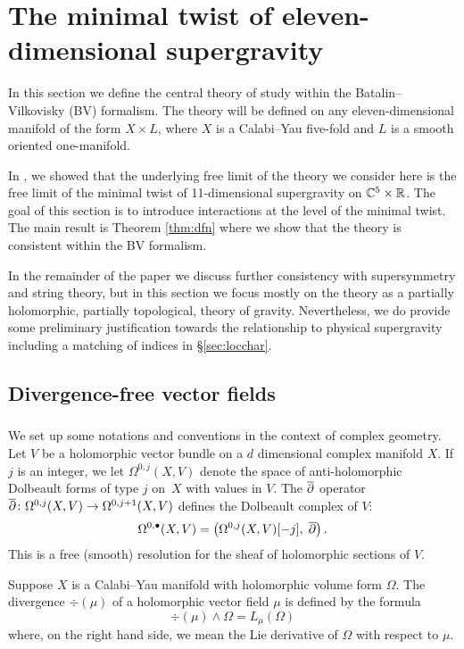 \section{The minimal twist of eleven-dimensional supergravity} 
\label{s:dfn}

In this section we define the central theory of study within the Batalin--Vilkovisky (BV) formalism. 
The theory will be defined on any eleven-dimensional manifold of the form $X \times L$, where $X$ is a Calabi--Yau five-fold and $L$ is a smooth oriented one-manifold.

In \cite{SWspinor}, we showed that the underlying free limit of the theory we consider here is the free limit of the minimal twist of 11-dimensional supergravity on $\mathbb C^5 \times \mathbb R$. 
The goal of this section is to introduce interactions at the level of the minimal twist. 
The main result is Theorem \ref{thm:dfn} where we show that the theory is consistent within the BV formalism. 

In the remainder of the paper we discuss further consistency with supersymmetry and string theory, but in this section we focus mostly on the theory as a partially holomorphic, partially topological, theory of gravity. 
Nevertheless, we do provide some preliminary justification towards the relationship to physical supergravity including a matching of indices in \S \ref{sec:locchar}. 

\subsection{Divergence-free vector fields} 

\subsubsection{}
\label{sec:divfree}
We set up some notations and conventions in the context of complex geometry. 
Let $V$ be a holomorphic vector bundle on a $d$ dimensional complex manifold $X$. 
If $j$ is an integer, we let $\Omega^{0,j}(X, V)$ denote the space of anti-holomorphic Dolbeault forms of type $j$ on~$X$ with values in $V$.
The $\overline{\partial}$ operator $\overline{\partial} \colon \Omega^{0,j}(X, V)\to \Omega^{0,j+1}(X,V)$ defines the Dolbeault complex of $V$:
\[
  \Omega^{0,\bullet}(X, V) = \left(\Omega^{0,j}(X, V)[-j] , \; \overline{\partial}\right) .
\]
This is a free (smooth) resolution for the sheaf of holomorphic sections of $V$.

Suppose $X$ is a Calabi--Yau manifold with holomorphic volume form $\Omega$.
The divergence $\div(\mu)$ of a holomorphic vector field $\mu$ is defined by the formula
\[
\div (\mu) \wedge \Omega = L_\mu (\Omega)
\]
where, on the right hand side, we mean the Lie derivative of $\Omega$ with respect to $\mu$.

